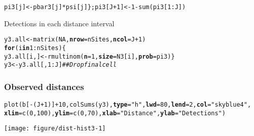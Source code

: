 \documentclass[color=usenames,dvipsnames]{beamer}\usepackage[]{graphicx}\usepackage[]{color}
\makeatletter
\newcommand{\hlnum}[1]{\textcolor[rgb]{0.69,0.494,0}{#1}}%
\newcommand{\hlstr}[1]{\textcolor[rgb]{0.749,0.012,0.012}{#1}}%
\newcommand{\hlcom}[1]{\textcolor[rgb]{0.514,0.506,0.514}{\textit{#1}}}%
\newcommand{\hlopt}[1]{\textcolor[rgb]{0,0,0}{#1}}%
\newcommand{\hlstd}[1]{\textcolor[rgb]{0,0,0}{#1}}%
\newcommand{\hlkwa}[1]{\textcolor[rgb]{0,0,0}{\textbf{#1}}}%
\newcommand{\hlkwb}[1]{\textcolor[rgb]{0,0.341,0.682}{#1}}%
\newcommand{\hlkwc}[1]{\textcolor[rgb]{0,0,0}{\textbf{#1}}}%
\newcommand{\hlkwd}[1]{\textcolor[rgb]{0.004,0.004,0.506}{#1}}%
\newenvironment{kframe}{%
 \def\at@end@of@kframe{}%
 \ifinner\ifhmode%
  \def\at@end@of@kframe{\end{minipage}}%
  \begin{minipage}{\columnwidth}%
 \fi\fi%
 \def\FrameCommand##1{\hskip\@totalleftmargin \hskip-\fboxsep
 \colorbox{shadecolor}{##1}\hskip-\fboxsep
     \hskip-\linewidth \hskip-\@totalleftmargin \hskip\columnwidth}%
 \MakeFramed {\advance\hsize-\width
   \@totalleftmargin\z@ \linewidth\hsize
   \@setminipage}}%
 {\par\unskip\endMakeFramed%
 \at@end@of@kframe}
\newenvironment{knitrout}{}{} %
\makeatother
\begin{document}
\begin{frame}[fragile]
\begin{knitrout}
\begin{kframe}
\begin{alltt}
    \hlstd{pi3[j]} \hlkwb{<-} \hlstd{pbar3[j]}\hlopt{*}\hlstd{psi[j] \}; pi3[J}\hlopt{+}\hlnum{1}\hlstd{]} \hlkwb{<-} \hlnum{1}\hlopt{-}\hlkwd{sum}\hlstd{(pi3[}\hlnum{1}\hlopt{:}\hlstd{J])}
\end{alltt}
\end{kframe}
\end{knitrout}
  \pause
  \vfill
  Detections in each distance interval
  \vspace{-6pt}
\begin{knitrout}\scriptsize
{}\color{fgcolor}\begin{kframe}
\begin{alltt}
\hlstd{y3.all} \hlkwb{<-} \hlkwd{matrix}\hlstd{(}\hlnum{NA}\hlstd{,} \hlkwc{nrow}\hlstd{=nSites,} \hlkwc{ncol}\hlstd{=J}\hlopt{+}\hlnum{1}\hlstd{)}
\hlkwa{for}\hlstd{(i} \hlkwa{in} \hlnum{1}\hlopt{:}\hlstd{nSites) \{}
    \hlstd{y3.all[i,]} \hlkwb{<-} \hlkwd{rmultinom}\hlstd{(}\hlkwc{n}\hlstd{=}\hlnum{1}\hlstd{,} \hlkwc{size}\hlstd{=N3[i],} \hlkwc{prob}\hlstd{=pi3)    \}}
\hlstd{y3} \hlkwb{<-} \hlstd{y3.all[,}\hlnum{1}\hlopt{:}\hlstd{J]}  \hlcom{## Drop final cell}
\end{alltt}
\end{kframe}
\end{knitrout}
\end{frame}



\begin{frame}[fragile]
  \frametitle{Observed distances}
  \centering
\begin{knitrout}\scriptsize
{}\color{fgcolor}\begin{kframe}
\begin{alltt}
\hlkwd{plot}\hlstd{(b[}\hlopt{-}\hlstd{(J}\hlopt{+}\hlnum{1}\hlstd{)]}\hlopt{+}\hlnum{10}\hlstd{,} \hlkwd{colSums}\hlstd{(y3),} \hlkwc{type}\hlstd{=}\hlstr{"h"}\hlstd{,} \hlkwc{lwd}\hlstd{=}\hlnum{80}\hlstd{,} \hlkwc{lend}\hlstd{=}\hlnum{2}\hlstd{,} \hlkwc{col}\hlstd{=}\hlstr{"skyblue4"}\hlstd{,}
     \hlkwc{xlim}\hlstd{=}\hlkwd{c}\hlstd{(}\hlnum{0}\hlstd{,}\hlnum{100}\hlstd{),} \hlkwc{ylim}\hlstd{=}\hlkwd{c}\hlstd{(}\hlnum{0}\hlstd{,} \hlnum{70}\hlstd{),} \hlkwc{xlab}\hlstd{=}\hlstr{"Distance"}\hlstd{,} \hlkwc{ylab}\hlstd{=}\hlstr{"Detections"}\hlstd{)}
\end{alltt}
\end{kframe}
\texttt{[image: figure/dist-hist3-1]} 
\end{knitrout}
\end{frame}
\end{document}
